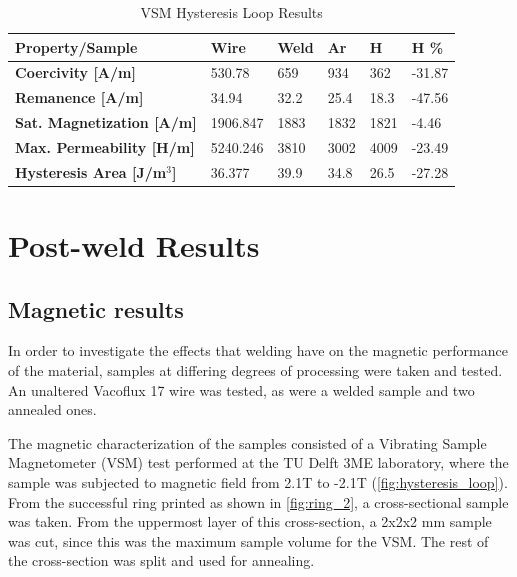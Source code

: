 \begin{table}[ht]
\centering
\caption{VSM Hysteresis Loop Results}
\label{tab:mag_data}
\begin{tabular}{|l|l|l|l|l|l|}
\hline
\textbf{Property/Sample} & \textbf{Wire} & \textbf{Weld} & \textbf{Ar} & \textbf{H} & \textbf{H \%} \\ \hline
\textbf{Coercivity [A/m]}         & 530.78   & 659  & 934  & 362  & -31.87 \\ \hline
\textbf{Remanence [A/m]}          & 34.94    & 32.2 & 25.4 & 18.3 & -47.56 \\ \hline
\textbf{Sat. Magnetization [A/m]} & 1906.847 & 1883 & 1832 & 1821 & -4.46  \\ \hline
\textbf{Max. Permeability [H/m]}  & 5240.246 & 3810 & 3002 & 4009 & -23.49 \\ \hline
\textbf{Hysteresis Area [J/m$^3$]}  & 36.377   & 39.9 & 34.8 & 26.5 & -27.28 \\ \hline
\end{tabular}
\end{table}

\section{Post-weld Results}

\subsection{Magnetic results}

In order to investigate the effects that welding have on the magnetic performance of the material, samples at differing degrees of processing were taken and tested. An unaltered Vacoflux 17 wire was tested, as were a welded sample and two annealed ones.

The magnetic characterization of the samples consisted of a Vibrating Sample Magnetometer (VSM) \cite{Gao} test performed at the TU Delft 3ME laboratory, where the sample was subjected to magnetic field from 2.1T to -2.1T (\autoref{fig:hysteresis_loop}). From the successful ring printed as shown in \autoref{fig:ring_2}, a cross-sectional sample was taken. From the uppermost layer of this cross-section, a 2x2x2 mm sample was cut, since this was the maximum sample volume for the VSM. The rest of the cross-section was split and used for annealing.

